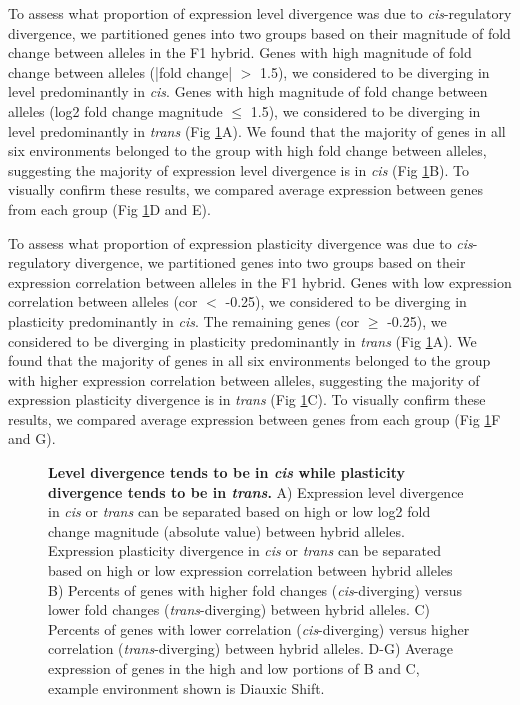 To assess what proportion of expression level divergence was due to \textit{cis}-regulatory divergence, we partitioned genes into two groups based on their magnitude of fold change between alleles in the F1 hybrid. Genes with high magnitude of fold change between alleles (|fold change| $>$ 1.5), we considered to be diverging in level predominantly in \textit{cis}. Genes with high magnitude of fold change between alleles (log2 fold change magnitude $\leq$ 1.5), we considered to be diverging in level predominantly in \textit{trans} (Fig \ref{fig:cistrans}A). We found that the majority of genes in all six environments belonged to the group with high fold change between alleles, suggesting the majority of expression level divergence is in \textit{cis} (Fig \ref{fig:cistrans}B). To visually confirm these results, we compared average expression between genes from each group (Fig \ref{fig:cistrans}D and E).

To assess what proportion of expression plasticity divergence was due to \textit{cis}-regulatory divergence, we partitioned genes into two groups based on their expression correlation between alleles in the F1 hybrid. Genes with low expression correlation between alleles (cor $<$ -0.25), we considered to be diverging in plasticity predominantly in \textit{cis}. The remaining genes (cor $\geq$ -0.25), we considered to be diverging in plasticity predominantly in \textit{trans} (Fig \ref{fig:cistrans}A). We found that the majority of genes in all six environments belonged to the group with higher expression correlation between alleles, suggesting the majority of expression plasticity divergence is in \textit{trans} (Fig \ref{fig:cistrans}C). To visually confirm these results, we compared average expression between genes from each group (Fig \ref{fig:cistrans}F and G).

\begin{figure}
    \centering
    \caption{\textbf{Level divergence tends to be in \textit{cis} while plasticity divergence tends to be in \textit{trans}.} A) Expression level divergence in \textit{cis} or \textit{trans} can be separated based on high or low log2 fold change magnitude (absolute value) between hybrid alleles. Expression plasticity divergence in \textit{cis} or \textit{trans} can be separated based on high or low expression correlation between hybrid alleles B) Percents of genes with higher fold changes (\textit{cis}-diverging) versus lower fold changes (\textit{trans}-diverging) between hybrid alleles. C) Percents of genes with lower correlation (\textit{cis}-diverging) versus higher correlation (\textit{trans}-diverging) between hybrid alleles. D-G) Average expression of genes in the high and low portions of B and C, example environment shown is Diauxic Shift.}
    \label{fig:cistrans}
\end{figure}

